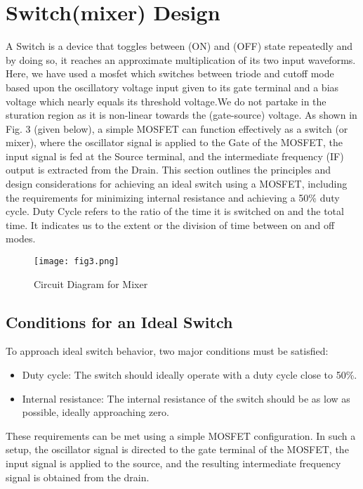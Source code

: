 \documentclass[conference]{IEEEtran}
\begin{document}
\section{Switch(mixer) Design}
A Switch is a device that toggles between (ON) and (OFF) state repeatedly and by doing so, it reaches an approximate multiplication of its two input waveforms.
Here, we have used a mosfet which switches between triode and cutoff mode based upon the oscillatory voltage input given to its gate terminal and a bias voltage which nearly equals its threshold voltage.We do not partake in the sturation region as it is non-linear towards the (gate-source) voltage.
As shown in Fig. 3 (given below), a simple MOSFET can function effectively as a switch (or mixer), where the oscillator signal is applied to the Gate of the MOSFET, the input signal is fed at the Source terminal, and the intermediate frequency (IF) output is extracted from the Drain. This section outlines the principles and design considerations for achieving an ideal switch using a MOSFET, including the requirements for minimizing internal resistance and achieving a 50\% duty cycle.
Duty Cycle refers to the ratio of the time it is switched on and the total time. It indicates us to the extent or the division of time between on and off modes.

\begin{figure}[htbp]
    \centering
    \texttt{[image: fig3.png]}
    \caption{Circuit Diagram for Mixer}
\end{figure}

\subsection{Conditions for an Ideal Switch}

To approach ideal switch behavior, two major conditions must be satisfied:

\begin{itemize}
    \item Duty cycle: The switch should ideally operate with a duty cycle close to 50\%.
    \item Internal resistance: The internal resistance of the switch should be as low as possible, ideally approaching zero.
\end{itemize}

These requirements can be met using a simple MOSFET configuration. In such a setup, the oscillator signal is directed to the gate terminal of the MOSFET, the input signal is applied to the source, and the resulting intermediate frequency signal is obtained from the drain.
\end{document}
